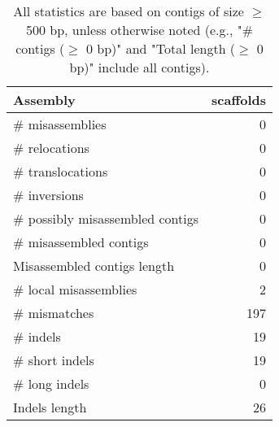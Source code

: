 \documentclass[12pt,a4paper]{article}
\begin{document}
\begin{table}[ht]
\begin{center}
\caption{All statistics are based on contigs of size $\geq$ 500 bp, unless otherwise noted (e.g., "\# contigs ($\geq$ 0 bp)" and "Total length ($\geq$ 0 bp)" include all contigs).}
\begin{tabular}{|l*{1}{|r}|}
\hline
Assembly & scaffolds \\ \hline
\# misassemblies & 0 \\ \hline
\hspace{5mm}\# relocations & 0 \\ \hline
\hspace{5mm}\# translocations & 0 \\ \hline
\hspace{5mm}\# inversions & 0 \\ \hline
\# possibly misassembled contigs & 0 \\ \hline
\# misassembled contigs & 0 \\ \hline
Misassembled contigs length & 0 \\ \hline
\# local misassemblies & 2 \\ \hline
\# mismatches & 197 \\ \hline
\# indels & 19 \\ \hline
\hspace{5mm}\# short indels & 19 \\ \hline
\hspace{5mm}\# long indels & 0 \\ \hline
Indels length & 26 \\ \hline
\end{tabular}
\end{center}
\end{table}
\end{document}
